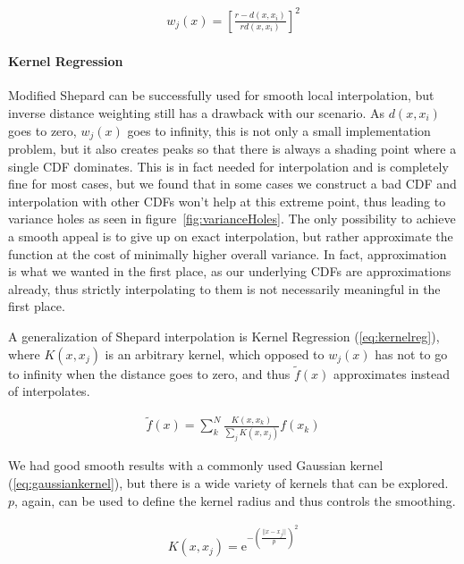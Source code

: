 \begin{align}\label{eq:modshep}
w_j(x) = \left[ \frac{ r - d(x, x_i)}{ rd(x, x_i) } \right]^2
\end{align}

\paragraph{Kernel Regression}

Modified Shepard can be successfully used for smooth local interpolation, but inverse distance weighting still has a drawback with our scenario. As $d(x, x_i)$ goes to zero, $w_j(x)$ goes to infinity, this is not only a small implementation problem, but it also creates peaks so that there is always a shading point where a single CDF dominates. This is in fact needed for interpolation and is completely fine for most cases, but we found that in some cases we construct a bad CDF and interpolation with other CDFs won't help at this extreme point, thus leading to variance holes as seen in figure~\ref{fig:varianceHoles}. The only possibility to achieve a smooth appeal is to give up on exact interpolation, but rather approximate the function at the cost of minimally higher overall variance. In fact, approximation is what we wanted in the first place, as our underlying CDFs are approximations already, thus strictly interpolating to them is not necessarily meaningful in the first place.

A generalization of Shepard interpolation is Kernel Regression (\ref{eq:kernelreg}), where $K(x, x_j)$ is an arbitrary kernel, which opposed to $w_j(x)$ has not to go to infinity when the distance goes to zero, and thus $\widetilde{f}(x)$ approximates instead of interpolates. 

\begin{align}\label{eq:kernelreg}
\widetilde{f}(x) = \sum_{k}^{N}\frac{K(x,x_k)}{\sum\nolimits_{j}K(x, x_j)}f(x_k)
\end{align}

We had good smooth results with a commonly used Gaussian kernel (\ref{eq:gaussiankernel}), but there is a wide variety of kernels that can be explored. $p$, again, can be used to define the kernel radius and thus controls the smoothing.

\begin{align}\label{eq:gaussiankernel}
K(x, x_j) = \mathrm{e}^{-\left(\frac{||x-x_j||}{p}\right)^2}
\end{align}

